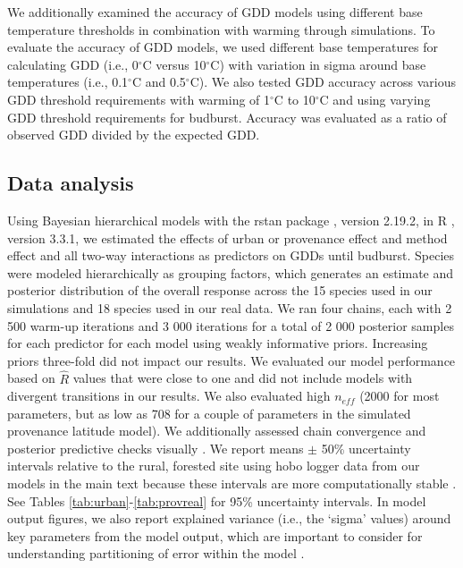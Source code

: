 \documentclass{article}\usepackage[]{graphicx}\usepackage[]{color}
\begin{document}
We additionally examined the accuracy of GDD models using different base temperature thresholds in combination with warming through simulations. To evaluate the accuracy of GDD models, we used different base temperatures for calculating GDD (i.e., 0$^{\circ}$C versus 10$^{\circ}$C) with variation in sigma around base temperatures (i.e., 0.1$^{\circ}$C and 0.5$^{\circ}$C). We also tested GDD accuracy across various GDD threshold requirements with warming of 1$^{\circ}$C to 10$^{\circ}$C and using varying GDD threshold requirements for budburst. Accuracy was evaluated as a ratio of observed GDD divided by the expected GDD.

\subsection*{Data analysis}
Using Bayesian hierarchical models with the rstan package \citep{rstan2019}, version 2.19.2,  in R \citep{R}, version 3.3.1, we estimated the effects of urban or provenance effect and method effect and all two-way interactions as predictors on GDDs until budburst. Species were modeled hierarchically as grouping factors, which generates an estimate and posterior distribution of the overall response across the 15 species used in our simulations and 18 species used in our real data. We ran four chains, each with 2 500 warm-up iterations and 3 000 iterations for a total of 2 000 posterior samples for each predictor for each model using weakly informative priors. Increasing priors three-fold did not impact our results. We evaluated our model performance based on $\hat{R}$ values that were close to one and did not include models with divergent transitions in our results. We also evaluated high $n_{eff}$ (2000 for most parameters, but as low as 708 for a couple of parameters in the simulated provenance latitude model). We additionally assessed chain convergence and posterior predictive checks visually \citep{BDA}. We report means $\pm$ 50\% uncertainty intervals relative to the rural, forested site using hobo logger data from our models in the main text because these intervals are more computationally stable \citep{Carpenter2017,BDA}. See Tables \ref{tab:urban}-\ref{tab:provreal} for 95\% uncertainty intervals. In model output figures, we also report explained variance (i.e., the `sigma' values) around key parameters from the model output, which are important to consider for understanding partitioning of error within the model \citep{BDA}.
\end{document}
